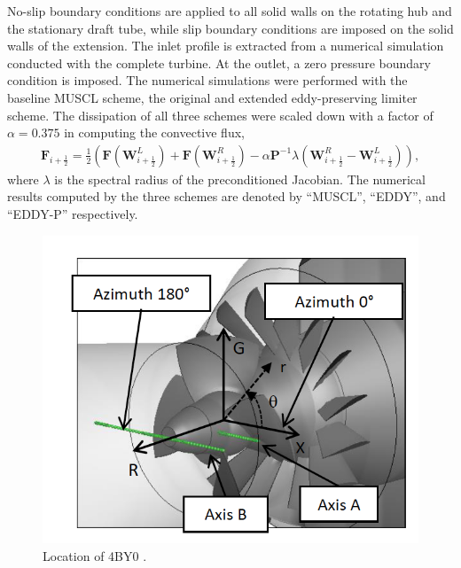 No-slip boundary conditions are applied to all solid walls on the rotating hub and the stationary draft tube, while slip boundary conditions are imposed on the solid walls of the extension. The inlet profile is extracted from a numerical simulation conducted with the complete turbine. At the outlet, a zero pressure boundary condition is imposed. The numerical simulations were performed with the baseline MUSCL scheme, the original and extended eddy-preserving limiter scheme. The dissipation of all three schemes were scaled down with a factor of $\alpha=0.375$ in computing the convective flux,
\begin{align} 
\mathbf{F}_{i+\frac{1}{2}} =\frac{1}{2}( \mathbf{F}(\mathbf{W}_{i+\frac{1}{2}}^{L})+\mathbf{F}(\mathbf{W}_{i+\frac{1}{2}}^{R})-\alpha \mathbf{P}^{-1} \lambda (\mathbf{W}_{i+\frac{1}{2}}^{R}-\mathbf{W}_{i+\frac{1}{2}}^{L})),
\label{rusanov}
\end{align}
where $\lambda$ is the spectral radius of the preconditioned Jacobian. The numerical results computed by the three schemes are denoted by ``MUSCL'', ``EDDY'', and ``EDDY-P'' respectively.
\begin{figure}[t]  
\centering      
     \includegraphics[clip=true, trim= 0.0cm 0.0cm 0.0cm 1.0cm,width=0.99\linewidth]{./figures/bulbt/Location4B}                  
     \caption{Location of 4BY0 \cite{vuillemard2014experimental}.}
     \label{plane4BY0}
\end{figure}
